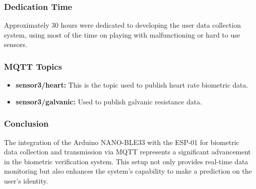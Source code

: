 \documentclass{article}
\begin{document}
\subsubsection{Dedication Time}
Approximately 30 hours were dedicated to developing the user data collection system, using most of the time on playing with malfunctioning or hard to use sensors.

\subsubsection{MQTT Topics}
\begin{itemize}
    \item \textbf{sensor3/heart:} This is the topic used to publish heart rate biometric data.
    \item \textbf{sensor3/galvanic:} Used to publish galvanic resistance data.
\end{itemize}

\subsubsection{Conclusion}
The integration of the Arduino NANO-BLE33 with the ESP-01 for biometric data collection and transmission via MQTT represents a significant advancement in the biometric verification system. This setup not only provides real-time data monitoring but also enhances the system's capability to make a prediction on the user's identity.
\end{document}
